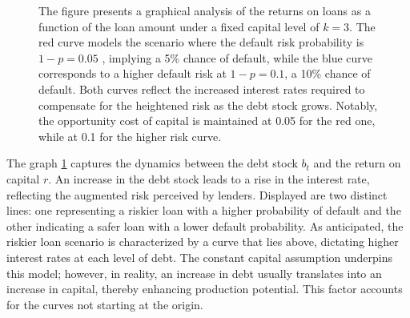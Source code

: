 \documentclass[12pt]{article}
\begin{document}
\begin{figure}
    \caption{The figure presents a graphical analysis of the returns on loans as a function of the loan amount under a fixed capital level of 
    \(k=3\). The red curve models the scenario where the default risk probability is 
    \(1-p=0.05\)
    , implying a 5\% chance of default, while the blue curve corresponds to a higher default risk at 
    \(1-p=0.1\), a 10\% chance of default. Both curves reflect the increased interest rates required to compensate for
    the heightened risk as the debt stock grows. Notably, the opportunity cost of capital is maintained at 0.05 for the
    red one, while at 0.1 for the higher risk curve.
    }
    \label{plot:part_constraint_r_lavarge}
\end{figure}

The graph \ref{plot:part_constraint_r_lavarge} captures the dynamics between the debt stock \(b_t\) and the return on capital \(r\). An
increase in the debt stock leads to a rise in the interest rate, reflecting the augmented risk
perceived by lenders. Displayed are two distinct lines: one representing a riskier loan with a higher probability of
default and the other indicating a safer loan with a lower default probability. As anticipated, the riskier loan
scenario is characterized by a curve that lies above, dictating higher interest rates at each level of debt. The
constant capital assumption underpins this model; however, in reality, an increase in debt usually translates into an
increase in capital, thereby enhancing production potential. This factor accounts for the curves not starting at the
origin. 
\end{document}
